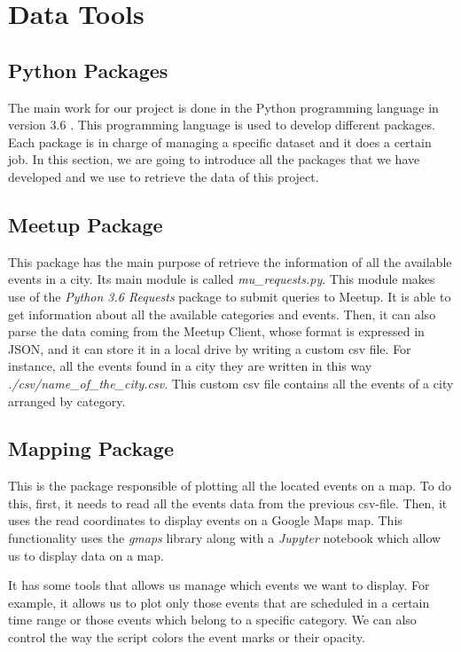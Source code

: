 \section{Data Tools}\label{sec:toolsanddata}
\subsection{Python Packages} 
The main work for our project is done in the Python programming language in version 3.6 \cite{python}. This programming language is used to develop different packages. Each package is in charge of managing a specific dataset and it does a certain job. In this section, we are going to introduce all the packages that we have developed and we use to retrieve the data of this project.

\subsection{Meetup Package}
This package has the main purpose of retrieve the information of all the available events in a city. Its main module is called \textit{mu_requests.py}. This module makes use of the \textit{Python 3.6 Requests} package to submit queries to Meetup. It is able to get information about all the available categories and events. Then, it can also parse the data coming from the Meetup Client, whose format is expressed in JSON, and it can store it in a local drive by writing a custom csv file. For instance, all the events found in a city they are written in this way \textit{./csv/name_of_the_city.csv}. This custom csv file contains all the events of a city arranged by category.

\subsection{Mapping Package}
This is the package responsible of plotting all the located events on a map. To do this, first, it needs to read all the events data from the previous csv-file. Then, it uses the read coordinates to display events on a Google Maps map. This functionality uses the \textit{gmaps} library along with a \textit{Jupyter} notebook which allow us to display data on a map.

It has some tools that allows us manage which events we want to display. For example, it allows us to plot only those events that are scheduled in a certain time range or those events which belong to a specific category. We can also control the way the script colors the event marks or their opacity.

